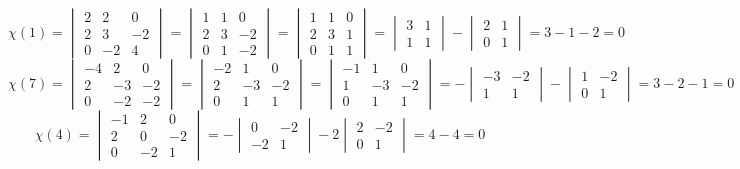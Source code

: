 $$ \chi(1) =
\begin{vmatrix}
	2 & 2 & 0 \\
    2 & 3 & -2 \\
    0 & -2 & 4
\end{vmatrix} =
\begin{vmatrix}
	1 & 1 & 0 \\
    2 & 3 & -2 \\
    0 & 1 & -2
\end{vmatrix} =
\begin{vmatrix}
    1 & 1 & 0 \\
    2 & 3 & 1 \\
    0 & 1 & 1
\end{vmatrix} =
\begin{vmatrix}
	3 & 1 \\
    1 & 1
\end{vmatrix} -
\begin{vmatrix}
	2 & 1 \\
    0 & 1
\end{vmatrix} = 3 - 1 - 2 = 0 $$
$$ \chi(7) =
\begin{vmatrix}
	-4 & 2 & 0 \\
    2 & -3 & -2 \\
    0 & -2 & -2
\end{vmatrix} =
\begin{vmatrix}
	-2 & 1 & 0 \\
    2 & -3 & -2 \\
    0 & 1 & 1
\end{vmatrix} =
\begin{vmatrix}
	-1 & 1 & 0 \\
    1 & -3 & -2 \\
    0 & 1 & 1
\end{vmatrix} = -
\begin{vmatrix}
	-3 & -2 \\
    1 & 1
\end{vmatrix} -
\begin{vmatrix}
	1 & -2 \\
    0 & 1
\end{vmatrix} = 3 - 2 - 1 = 0 $$
$$ \chi(4) =
\begin{vmatrix}
	-1 & 2 & 0 \\
    2 & 0 & -2 \\
    0 & -2 & 1
\end{vmatrix} = -
\begin{vmatrix}
	0 & -2 \\
    -2 & 1
\end{vmatrix} - 2
\begin{vmatrix}
	2 & -2 \\
    0 & 1
\end{vmatrix} = 4 - 4 = 0 $$
